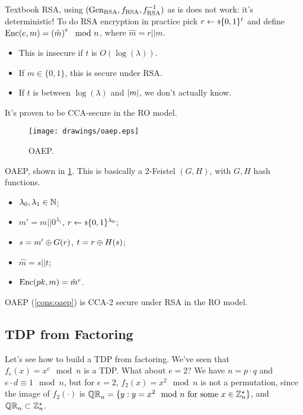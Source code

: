 Textbook \ac{RSA}, \ie using $\RSAtuple$ as is does not work: it's deterministic!
To do \ac{RSA} encryption in practice pick $r \rand{\{0,1\}^{t}}$ and define $\Enc(e,m) = \left(\hat{m}\right)^{e} \mod n$, where $\hat{m} = r || m$.
\begin{itemize}
	\item This is insecure if $t$ is $O(\log(\lambda))$.
	\item If $m \in \{0,1\}$, this is secure under \ac{RSA}.
	\item If $t$ is between $\log(\lambda)$ and $\abs{m}$, we don't actually know.
\end{itemize}
It's proven to be \ac{CCA}-secure in the \ac{RO} model. 

\begin{construction} \label{cons:oaep}
	\begin{figure}
		\centering
		\texttt{[image: drawings/oaep.eps]}
		\caption{\acl{OAEP}.}
		\label{fig:oaep}
	\end{figure}
	\ac{OAEP}, shown in \cref{fig:oaep}.
	This is basically a 2-Feistel $(G,H)$, with $G,H$ hash functions.
	\begin{itemize}
		\item $\lambda_0, \lambda_1 \in \NaturalsZ$;
		\item $m' = m || 0^{\lambda_1}$, $r \rand{\{0,1\}^{\lambda_0}}$;
		\item $s = m' \xor G(r)$, $t = r \xor H(s)$;
		\item $\hat{m} = s || t$;
		\item $\Enc(\pk, m) = \hat{m}^{e}$. \qedhere
	\end{itemize}
\end{construction}

\begin{theorem}
	\ac{OAEP} (\cref{cons:oaep}) is \ac{CCA}-2 secure under \ac{RSA} in the \ac{RO} model.
\end{theorem}

\subsection{\acl{TDP} from Factoring}

Let's see how to build a \ac{TDP} from factoring.
We've seen that $f_e(x) = x^e \mod n$ is a \ac{TDP}.
What about $e = 2$?
We have $n = p \cdot q$ and $e \cdot d \equiv 1 \mod n$, but for $e = 2$, $f_2(x) = x^2 \mod n$ is not a permutation, since the image of $f_2(\cdot)$ is $\QR[n] = \{ y : y = x^2 \mod n \text{ for some } x \in \Integers_n^{\star}\}$, and $\QR[n] \subset \Integers_n^{\star}$.

